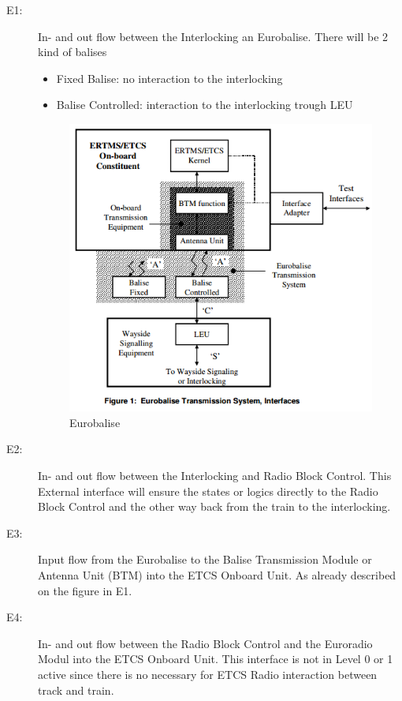 \begin{description}
\item[E1:] In- and out flow between the Interlocking an Eurobalise. There will be 2 kind of balises
\begin{itemize}
\item Fixed Balise: no interaction to the interlocking
\item Balise Controlled: interaction to the interlocking trough LEU
\end{itemize}
\begin{figure}
\centering
\includegraphics[scale=0.8]{images/Eurobalise}
\caption{Eurobalise}
\label{Eurobalise}
\end{figure}

\item[E2:] In- and out flow between the Interlocking and Radio Block Control.
This External interface will ensure the states or logics directly to the Radio Block Control and the other way back from the train to the interlocking.

\item[E3:] Input flow from the Eurobalise to the Balise Transmission Module or Antenna Unit (BTM) into the ETCS Onboard Unit. As already described on the figure in E1.

\item[E4:] In- and out flow between the Radio Block Control and the Euroradio Modul into the ETCS Onboard Unit. This interface is not in Level 0 or 1 active since there is no necessary for ETCS Radio interaction between track and train.


\end{description}
